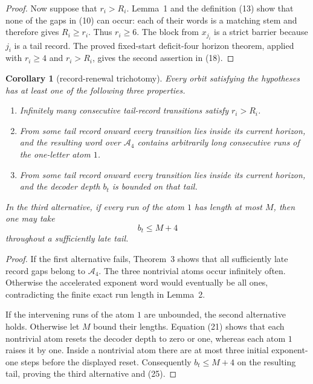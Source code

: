 \documentclass[11pt]{article}
\newtheorem{corollary}[theorem]{Corollary}
\begin{document}
\begin{proof}
Now suppose that $r_i>R_i$.  Lemma~1 and the definition (13) show that none
of the gaps in (10) can occur: each of their words is a matching stem and
therefore gives $R_i\geq r_i$.  Thus $r_i\geq6$.  The block from
$x_{j_i}$ is a strict barrier because $j_i$ is a tail record.  The proved
fixed-start deficit-four horizon theorem, applied with $r_i\geq4$ and
$r_i>R_i$, gives the second assertion in (18).
\end{proof}

\begin{corollary}[record-renewal trichotomy]
Every orbit satisfying the hypotheses has at least one of the following
three properties.

\begin{enumerate}
  \item Infinitely many consecutive tail-record transitions satisfy
  $r_i>R_i$.

  \item From some tail record onward every transition lies inside its
  current horizon, and the resulting word over $\mathcal A_4$ contains
  arbitrarily long consecutive runs of the one-letter atom $1$.

  \item From some tail record onward every transition lies inside its
  current horizon, and the decoder depth $b_t$ is bounded on that tail.
\end{enumerate}
In the third alternative, if every run of the atom $1$ has length at most
$M$, then one may take
\[
  b_t\leq M+4
  \tag{25}
\]
throughout a sufficiently late tail.
\end{corollary}

\begin{proof}
If the first alternative fails, Theorem~3 shows that all sufficiently late
record gaps belong to $\mathcal A_4$.  The three nontrivial atoms occur
infinitely often.  Otherwise the accelerated exponent word would
eventually be all ones, contradicting the finite exact run length in
Lemma~2.

If the intervening runs of the atom $1$ are unbounded, the second
alternative holds.  Otherwise let $M$ bound their lengths.  Equation (21)
shows that each nontrivial atom resets the decoder depth to zero or one,
whereas each atom $1$ raises it by one.  Inside a nontrivial atom there are
at most three initial exponent-one steps before the displayed reset.
Consequently $b_t\leq M+4$ on the resulting tail, proving the third
alternative and (25).
\end{proof}
\end{document}
